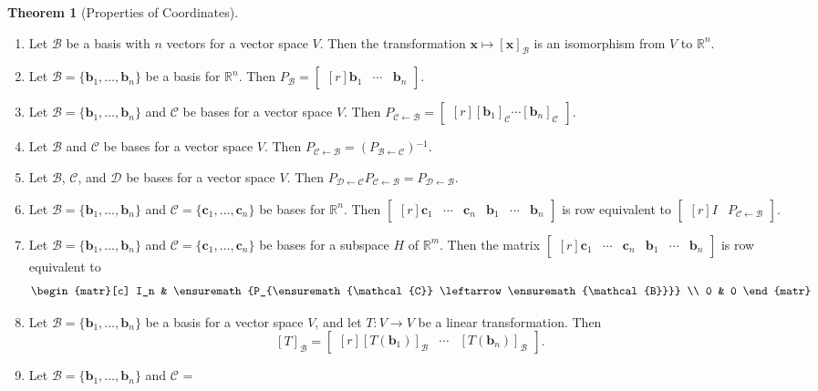 \documentclass{myart}
\renewcommand{\vec}[1]{\ensuremath{\mathbf{#1}}}
\newcommand{\mat}[1]{\ensuremath{#1}}
\newcommand{\R}[1][]{\ensuremath{\mathbb{R}^{#1}}}
\newcommand{\MAT}[2][r]{\ensuremath{\begin{bmatrix*}[#1]#2\end{bmatrix*}}}
\newcommand{\set}[1]{\ensuremath{\{#1\}}}
\newcommand{\inv}{\ensuremath{^{-1}}}
\newcommand{\basis}[1]{\ensuremath{\mathcal{#1}}}
\newcommand{\from}{\leftarrow}
\newcommand{\coord}[2]{\ensuremath{\left[#1\right]_{#2}}}
\newcommand{\chcoordr}[1]{\ensuremath{P_{#1}}}
\newcommand{\chcoord}[2]{\ensuremath{P_{#1 \from #2}}}
\newcommand{\transmat}[2]{\coord{#1}{#2}}
\newcommand{\many}[2][n]{\ensuremath{{#2}_1, \ldots, {#2}_{#1}}}
\theoremstyle{definition}
\newtheorem{thm}{Theorem}
\begin{document}
\begin{thm}[Properties of Coordinates] \hfill
  \begin{enumerate}
  \item Let \basis B be a basis with $n$ vectors for a vector space
    $V$. Then the transformation $\vec x \mapsto \coord{\vec x}{\basis
      B}$ is an isomorphism from $V$ to \R[n].
  \item Let $\basis B = \set{\many{\vec b}}$ be a basis for \R[n].
    Then $\chcoordr{\basis B} = \MAT{\vec b_1 & \cdots & \vec b_n}$.
  \item Let $\basis B = \set{\many{\vec b}}$ and \basis C be bases for
    a vector space $V$. Then $\chcoord{\basis C}{\basis B} =
    \MAT{\coord{\vec b_1}{\basis C} \cdots \coord{\vec b_n}{\basis
        C}}$.
  \item Let \basis B and \basis C be bases for a vector space $V$.
    Then $\chcoord{\basis C}{\basis B} = \left(\chcoord{\basis
        B}{\basis C}\right)\inv$.
  \item Let \basis B, \basis C, and \basis D be bases for a vector
    space $V$. Then $\chcoord{\basis D}{\basis C} \chcoord{\basis
      C}{\basis B} = \chcoord{\basis D}{\basis B}$.
  \item Let $\basis B = \set{\many{\vec b}}$ and $\basis C =
    \set{\many{\vec c}}$ be bases for \R[n]. Then \MAT{\vec c_1 &
      \cdots & \vec c_n & \vec b_1 & \cdots & \vec b_n} is row
    equivalent to \MAT{\mat I & \chcoord{\basis C}{\basis B}}.
  \item Let $\basis B = \set{\many{\vec b}}$ and $\basis C =
    \set{\many{\vec c}}$ be bases for a subspace $H$ of \R[m]. Then
    the matrix \MAT{\vec c_1 & \cdots & \vec c_n & \vec b_1 & \cdots &
      \vec b_n} is row equivalent to
    \begin{equation*}
      \begin{matr}[c]
        I_n & \chcoord{\basis C}{\basis B} \\
        0 & 0
      \end{matr}
    \end{equation*}
  \item Let $\basis B = \set{\many{\vec b}}$ be a basis for a vector
    space $V$, and let $T: V \to V$ be a linear transformation. Then
    \begin{equation*}
      \transmat{T}{\basis B} = \MAT{
        \coord{T(\vec b_1)}{\basis B} &
        \cdots &
        \coord{T(\vec b_n)}{\basis B}
      }.
    \end{equation*}
  \item Let $\basis B = \set{\many{\vec b}}$ and \basis C =

\end{enumerate}
\end{thm}
\end{document}
